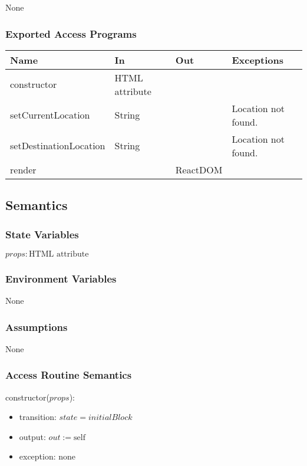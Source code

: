 \documentclass[12pt, titlepage]{article}
\begin{document}
None

\subsubsection{Exported Access Programs}

\begin{tabular}{| l | l | l | l |}
  \hline
  \textbf{Name} & \textbf{In} & \textbf{Out} & \textbf{Exceptions}\\
  \hline
  constructor & HTML attribute & ~ & ~\\
  \hline
  setCurrentLocation & String & ~ & Location not found.\\
  \hline
  setDestinationLocation & String & ~ & Location not found.\\
  \hline
  render & ~ & ReactDOM & ~\\
  \hline
\end{tabular}

\subsection{Semantics}

\subsubsection{State Variables}

$\mathit{props}: \text{HTML attribute}$\\

\subsubsection{Environment Variables}

None

\subsubsection{Assumptions}

None

\subsubsection{Access Routine Semantics}

\noindent constructor($props$):
\begin{itemize}
\item transition: $\mathit{state} = initialBlock$
\item output: $out := \mbox{self}$
\item exception: none
\end{itemize}
\end{document}
